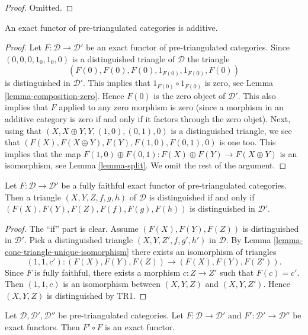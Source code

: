 \begin{proof}
Omitted.
\end{proof}

\begin{lemma}
\label{lemma-exact-functor-additive}
An exact functor of pre-triangulated categories is additive.
\end{lemma}

\begin{proof}
Let $F : \mathcal{D} \to \mathcal{D}'$ be an exact functor of
pre-triangulated categories. Since
$(0, 0, 0, 1_0, 1_0, 0)$ is a distinguished triangle of $\mathcal{D}$
the triangle
$$
(F(0), F(0), F(0), 1_{F(0)}, 1_{F(0)}, F(0))
$$
is distinguished in $\mathcal{D}'$.
This implies that $1_{F(0)} \circ 1_{F(0)}$ is zero, see
Lemma \ref{lemma-composition-zero}.
Hence $F(0)$ is the zero object of $\mathcal{D}'$. This also implies
that $F$ applied to any zero morphism is zero (since a morphism in
an additive category is zero if and only if it factors through the
zero objet). Next, using that
$(X, X \oplus Y, Y, (1, 0), (0, 1), 0)$ is a distinguished triangle,
we see that $(F(X), F(X \oplus Y), F(Y), F(1, 0), F(0, 1), 0)$ is
one too. This implies that the map
$F(1, 0) \oplus F(0, 1) : F(X) \oplus F(Y) \to F(X \oplus Y)$
is an isomorphism, see
Lemma \ref{lemma-split}.
We omit the rest of the argument.
\end{proof}

\begin{lemma}
\label{lemma-exact-equivalence}
Let $F : \mathcal{D} \to \mathcal{D}'$ be a fully faithful exact functor
of pre-triangulated categories. Then a triangle $(X, Y, Z, f, g, h)$
of $\mathcal{D}$ is distinguished if and only if
$(F(X), F(Y), F(Z), F(f), F(g), F(h))$ is distinguished in $\mathcal{D}'$.
\end{lemma}

\begin{proof}
The ``if'' part is clear. Assume $(F(X), F(Y), F(Z))$ is
distinguished in $\mathcal{D}'$. Pick a distinguished triangle
$(X, Y, Z', f, g', h')$ in $\mathcal{D}$. By
Lemma \ref{lemma-cone-triangle-unique-isomorphism}
there exists an isomorphism of triangles
$$
(1, 1, c') : (F(X), F(Y), F(Z)) \longrightarrow (F(X), F(Y), F(Z')).
$$
Since $F$ is fully faithful, there exists a morphism $c : Z \to Z'$
such that $F(c) = c'$. Then $(1, 1, c)$ is an isomorphism between
$(X, Y, Z)$ and $(X, Y, Z')$. Hence $(X, Y, Z)$ is distinguished
by TR1.
\end{proof}

\begin{lemma}
\label{lemma-composition-exact}
Let $\mathcal{D}, \mathcal{D}', \mathcal{D}''$ be pre-triangulated categories.
Let $F : \mathcal{D} \to \mathcal{D}'$ and
$F' : \mathcal{D}' \to \mathcal{D}''$ be exact functors.
Then $F' \circ F$ is an exact functor.
\end{lemma}

